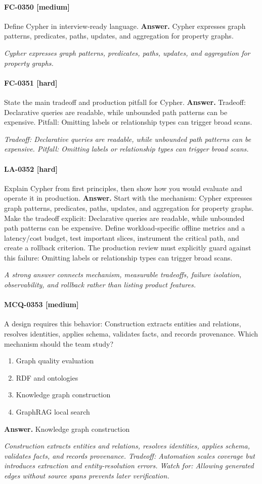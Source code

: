 \paragraph{FC-0350 [medium]} Define Cypher in interview-ready language.
\noindent\textbf{Answer.} Cypher expresses graph patterns, predicates, paths, updates, and aggregation for property graphs.
\par\textit{Cypher expresses graph patterns, predicates, paths, updates, and aggregation for property graphs.}
\paragraph{FC-0351 [hard]} State the main tradeoff and production pitfall for Cypher.
\noindent\textbf{Answer.} Tradeoff: Declarative queries are readable, while unbounded path patterns can be expensive. Pitfall: Omitting labels or relationship types can trigger broad scans.
\par\textit{Tradeoff: Declarative queries are readable, while unbounded path patterns can be expensive. Pitfall: Omitting labels or relationship types can trigger broad scans.}
\paragraph{LA-0352 [hard]} Explain Cypher from first principles, then show how you would evaluate and operate it in production.
\noindent\textbf{Answer.} Start with the mechanism: Cypher expresses graph patterns, predicates, paths, updates, and aggregation for property graphs. Make the tradeoff explicit: Declarative queries are readable, while unbounded path patterns can be expensive. Define workload-specific offline metrics and a latency/cost budget, test important slices, instrument the critical path, and create a rollback criterion. The production review must explicitly guard against this failure: Omitting labels or relationship types can trigger broad scans.
\par\textit{A strong answer connects mechanism, measurable tradeoffs, failure isolation, observability, and rollback rather than listing product features.}
\paragraph{MCQ-0353 [medium]} A design requires this behavior: Construction extracts entities and relations, resolves identities, applies schema, validates facts, and records provenance. Which mechanism should the team study?
\begin{enumerate}[label=\Alph*.]
\item Graph quality evaluation
\item RDF and ontologies
\item Knowledge graph construction
\item GraphRAG local search
\end{enumerate}
\noindent\textbf{Answer.} Knowledge graph construction
\par\textit{Construction extracts entities and relations, resolves identities, applies schema, validates facts, and records provenance. Tradeoff: Automation scales coverage but introduces extraction and entity-resolution errors. Watch for: Allowing generated edges without source spans prevents later verification.}
